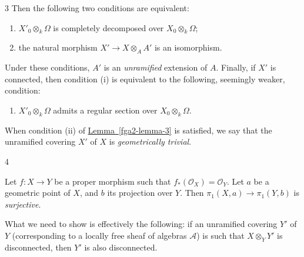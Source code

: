 \begin{lemma}{3}
    Then the following two conditions are equivalent:

    
 \begin{enumerate}
      
 \item[i.]
        \(X'_0\otimes _k\Omega \) is completely decomposed over \(X_0\otimes _k\Omega \);
      

      
 \item[ii.]
        the natural morphism \(X'\to  X\otimes _AA'\) is an isomorphism.
      

    \end{enumerate}


    Under these conditions, \(A'\) is an \emph{unramified} extension of \(A\).
    Finally, if \(X'\) is connected, then condition (i) is equivalent to the following, seemingly weaker, condition:

    
 \begin{enumerate}
      
 \item[i bis.]
        \(X'_0\otimes _k\Omega \) admits a regular section over \(X_0\otimes _k\Omega \).
      

    \end{enumerate}\end{lemma}\par{}When condition (ii) of \hyperref[fga2-lemma-3]{Lemma~\ref*{fga2-lemma-3}} is satisfied, we say that the unramified covering \(X'\) of \(X\) is \emph{geometrically trivial}.\begin{lemma}{4}\label{fga2-lemma-4}\skipsinglepar\par{}Let \(f\colon  X\to  Y\) be a proper morphism such that \(f_*(\mathcal {O}_X)=\mathcal {O}_Y\).
    Let \(a\) be a geometric point of \(X\), and \(b\) its projection over \(Y\).
    Then \(\pi _1(X,a)\to \pi _1(Y,b)\) is \emph{surjective}.\end{lemma}\par{}What we need to show is effectively the following: if an unramified covering \(Y'\) of \(Y\) (corresponding to a locally free sheaf of algebras \(\mathscr {A}\)) is such that \(X\otimes _YY'\) is disconnected, then \(Y'\) is also disconnected.
